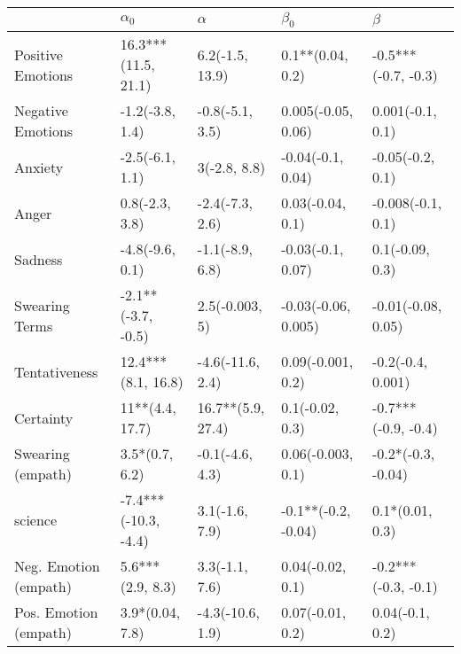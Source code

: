 \begin{tabular}{lllll}
\toprule
{} &            $\alpha_0$ &           $\alpha$ &            $\beta_0$ &              $\beta$ \\
\midrule
Positive Emotions     &   16.3***(11.5, 21.1) &    6.2(-1.5, 13.9) &     0.1**(0.04, 0.2) &  -0.5***(-0.7, -0.3) \\
Negative Emotions     &       -1.2(-3.8, 1.4) &    -0.8(-5.1, 3.5) &   0.005(-0.05, 0.06) &     0.001(-0.1, 0.1) \\
Anxiety               &       -2.5(-6.1, 1.1) &       3(-2.8, 8.8) &    -0.04(-0.1, 0.04) &     -0.05(-0.2, 0.1) \\
Anger                 &        0.8(-2.3, 3.8) &    -2.4(-7.3, 2.6) &     0.03(-0.04, 0.1) &    -0.008(-0.1, 0.1) \\
Sadness               &       -4.8(-9.6, 0.1) &    -1.1(-8.9, 6.8) &    -0.03(-0.1, 0.07) &      0.1(-0.09, 0.3) \\
Swearing Terms        &    -2.1**(-3.7, -0.5) &     2.5(-0.003, 5) &  -0.03(-0.06, 0.005) &   -0.01(-0.08, 0.05) \\
Tentativeness         &    12.4***(8.1, 16.8) &   -4.6(-11.6, 2.4) &    0.09(-0.001, 0.2) &    -0.2(-0.4, 0.001) \\
Certainty             &       11**(4.4, 17.7) &  16.7**(5.9, 27.4) &      0.1(-0.02, 0.3) &  -0.7***(-0.9, -0.4) \\
Swearing (empath)     &        3.5*(0.7, 6.2) &    -0.1(-4.6, 4.3) &    0.06(-0.003, 0.1) &   -0.2*(-0.3, -0.04) \\
science               &  -7.4***(-10.3, -4.4) &     3.1(-1.6, 7.9) &  -0.1**(-0.2, -0.04) &      0.1*(0.01, 0.3) \\
Neg. Emotion (empath) &      5.6***(2.9, 8.3) &     3.3(-1.1, 7.6) &     0.04(-0.02, 0.1) &  -0.2***(-0.3, -0.1) \\
Pos. Emotion (empath) &       3.9*(0.04, 7.8) &   -4.3(-10.6, 1.9) &     0.07(-0.01, 0.2) &      0.04(-0.1, 0.2) \\
\bottomrule
\end{tabular}
